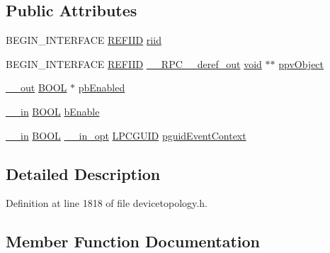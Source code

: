 \subsection*{Public Attributes}
\begin{DoxyCompactItemize}
\item 
B\+E\+G\+I\+N\+\_\+\+I\+N\+T\+E\+R\+F\+A\+CE \hyperlink{px__win__ds_8c_a80ec49c8ae61e234197d5071d2df497d}{R\+E\+F\+I\+ID} \hyperlink{struct_i_audio_auto_gain_control_vtbl_a97d8367a596dc1604ad10423612fe176}{riid}
\item 
B\+E\+G\+I\+N\+\_\+\+I\+N\+T\+E\+R\+F\+A\+CE \hyperlink{px__win__ds_8c_a80ec49c8ae61e234197d5071d2df497d}{R\+E\+F\+I\+ID} \hyperlink{rpcsal_8h_a23bc188526f10656f9c79d950f6c3192}{\+\_\+\+\_\+\+R\+P\+C\+\_\+\+\_\+deref\+\_\+out} \hyperlink{sound_8c_ae35f5844602719cf66324f4de2a658b3}{void} $\ast$$\ast$ \hyperlink{struct_i_audio_auto_gain_control_vtbl_a186510ffd3581e6b8a7bd0d40422d1a4}{ppv\+Object}
\item 
\hyperlink{sal_8h_abb4c3c1135aab6c47cff22e7c16efb74}{\+\_\+\+\_\+out} \hyperlink{nfilterkit_8h_a3be13892ae7076009afcf121347dd319}{B\+O\+OL} $\ast$ \hyperlink{struct_i_audio_auto_gain_control_vtbl_a59967e9aa7bee24c953a923653bd036b}{pb\+Enabled}
\item 
\hyperlink{sal_8h_a3f6b8655e1aa9dfc15a9029f0343009e}{\+\_\+\+\_\+in} \hyperlink{nfilterkit_8h_a3be13892ae7076009afcf121347dd319}{B\+O\+OL} \hyperlink{struct_i_audio_auto_gain_control_vtbl_a8d1a4fb5d1cf418b17f4c57b4659d23d}{b\+Enable}
\item 
\hyperlink{sal_8h_a3f6b8655e1aa9dfc15a9029f0343009e}{\+\_\+\+\_\+in} \hyperlink{nfilterkit_8h_a3be13892ae7076009afcf121347dd319}{B\+O\+OL} \hyperlink{sal_8h_a9c2d0f2980e51b51bb405ee2a31a3353}{\+\_\+\+\_\+in\+\_\+opt} \hyperlink{pa__win__wasapi_8c_a9c061ab1f26db8746b3dab38991f48a0}{L\+P\+C\+G\+U\+ID} \hyperlink{struct_i_audio_auto_gain_control_vtbl_a57c49fbfcd7452feba75e6d7cdfaf2ef}{pguid\+Event\+Context}
\end{DoxyCompactItemize}


\subsection{Detailed Description}


Definition at line 1818 of file devicetopology.\+h.



\subsection{Member Function Documentation}
